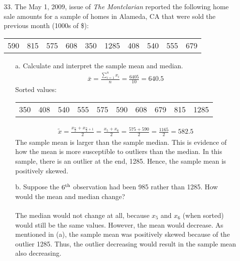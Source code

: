 \documentclass[letterpaper,12pt]{article}
\begin{document}
\maketitle

\begin{enumerate}
  \item[33.]
    The May 1, 2009, issue of \textit{The Montclarian} reported the following home sale amounts for a sample of homes in Alameda, CA that were sold the previous month (1000s of \$):
    \begin{center}
      \begin{tabular}{cccccccccc}
        590 & 815 & 575 & 608 & 350 & 1285 & 408 & 540 & 555 & 679
      \end{tabular}
    \end{center}
    \begin{enumerate}
      \item[a.]
        Calculate and interpret the sample mean and median.
        \begin{align*}
          \bar{x} = \frac{\sum_{i=1}^{n} x_{i}}{n} = \frac{6405}{10} = 640.5
        \end{align*}
        Sorted values:
        \begin{center}
          \begin{tabular}{cccccccccc}
            350 & 408 & 540 & 555 & 575 & 590 & 608 & 679 & 815 & 1285
          \end{tabular}
        \end{center}
        \begin{align*}
          \tilde{x} = \frac{x_{\frac{n}{2}} + x_{\frac{n}{2} + 1}}{2} = \frac{x_{5} + x_{6}}{2} = \frac{575 + 590}{2} = \frac{1165}{2} = 582.5
        \end{align*}
        The sample mean is larger than the sample median. This is evidence of how the mean is more susceptible to outliers than the median. In this sample, there is an outlier at the end, 1285. Hence, the sample mean is positively skewed.
      \item[b.]
        Suppose the $6\textsuperscript{th}$ observation had been 985 rather than 1285. How would the mean and median change? \\ \\
        The median would not change at all, because $x_{5}$ and $x_{6}$ (when sorted) would still be the same values. However, the mean would decrease. As mentioned in (a), the sample mean was positively skewed because of the outlier 1285. Thus, the outlier decreasing would result in the sample mean also decreasing.

\end{enumerate}
\end{enumerate}
\end{document}
